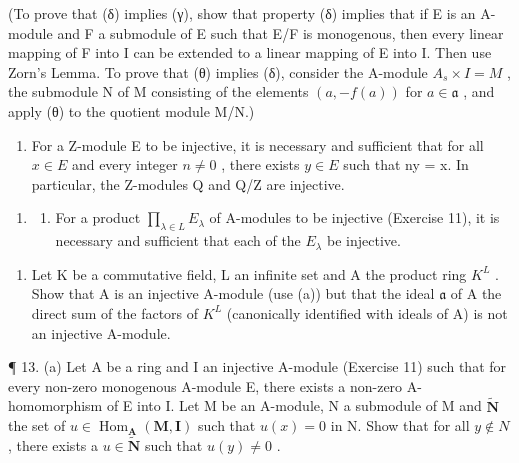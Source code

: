 (To prove that (δ) implies (γ), show that property (δ) implies that if E is an A-module and F a submodule of E such that E/F is monogenous, then every linear mapping of F into I can be extended to a linear mapping of E into I. Then use Zorn's Lemma. To prove that (θ) implies (δ), consider the A-module \(A_{s} \times I = M\) , the submodule N of M consisting of the elements \((a, -f(a))\) for \(a \in \mathfrak{a}\) , and apply (θ) to the quotient module M/N.)

\begin{enumerate}
\def\labelenumi{(\alph{enumi})}
\setcounter{enumi}{1}
\tightlist
\item
  For a Z-module E to be injective, it is necessary and sufficient that for all \(x \in E\) and every integer \(n \neq 0\) , there exists \(y \in E\) such that ny = x. In particular, the Z-modules Q and Q/Z are injective.
\end{enumerate}

\begin{enumerate}
\def\labelenumi{\arabic{enumi}.}
\setcounter{enumi}{11}
\tightlist
\item
  \begin{enumerate}
  \def\labelenumii{(\alph{enumii})}
  \tightlist
  \item
    For a product \(\prod_{\lambda \in L} E_{\lambda}\) of A-modules to be injective (Exercise 11), it is necessary and sufficient that each of the \(E_{\lambda}\) be injective.
  \end{enumerate}
\end{enumerate}

\begin{enumerate}
\def\labelenumi{(\alph{enumi})}
\setcounter{enumi}{1}
\tightlist
\item
  Let K be a commutative field, L an infinite set and A the product ring \(K^{L}\) . Show that A is an injective A-module (use (a)) but that the ideal \(\mathfrak{a}\) of A the direct sum of the factors of \(K^{L}\) (canonically identified with ideals of A) is not an injective A-module.
\end{enumerate}

¶ 13. (a) Let A be a ring and I an injective A-module (Exercise 11) such that for every non-zero monogenous A-module E, there exists a non-zero A-homomorphism of E into I. Let M be an A-module, N a submodule of M and \(\tilde{\mathbf{N}}\) the set of \(u \in \operatorname{Hom}_{\mathbf{A}}(\mathbf{M}, \mathbf{I})\) such that \(u(x) = 0\) in N. Show that for all \(y \notin N\) , there exists a \(u \in \tilde{\mathbf{N}}\) such that \(u(y) \neq 0\) .

